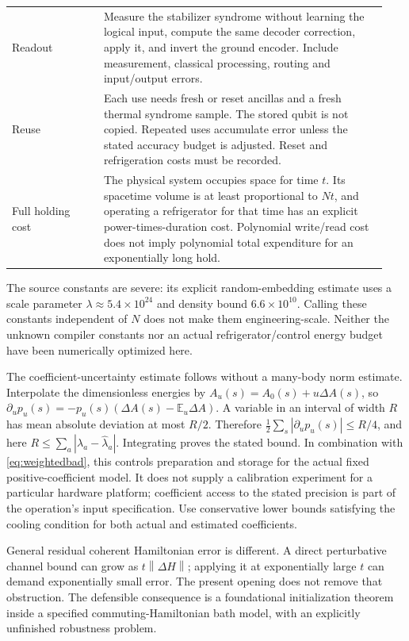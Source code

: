 \documentclass[11pt,a4paper]{article}
\newcommand{\norm}[1]{\left\lVert#1\right\rVert}
\begin{document}
\begin{longtable}{@{}P{0.23\linewidth}P{0.71\linewidth}@{}}
Readout & Measure the stabilizer syndrome without learning the logical input, compute the same decoder correction, apply it, and invert the ground encoder. Include measurement, classical processing, routing and input/output errors.\\[5pt]
Reuse & Each use needs fresh or reset ancillas and a fresh thermal syndrome sample. The stored qubit is not copied. Repeated uses accumulate error unless the stated accuracy budget is adjusted. Reset and refrigeration costs must be recorded.\\[5pt]
Full holding cost & The physical system occupies space for time $t$. Its spacetime volume is at least proportional to $Nt$, and operating a refrigerator for that time has an explicit power-times-duration cost. Polynomial write/read cost does not imply polynomial total expenditure for an exponentially long hold.\\
\bottomrule
\end{longtable}
\endgroup

The source constants are severe: its explicit random-embedding estimate uses a scale parameter $\lambda\approx5.4\times10^{24}$ and density bound $6.6\times10^{10}$.\cite{bdl} Calling these constants independent of $N$ does not make them engineering-scale. Neither the unknown compiler constants nor an actual refrigerator/control energy budget have been numerically optimized here.

The coefficient-uncertainty estimate follows without a many-body norm estimate. Interpolate the dimensionless energies by $A_u(s)=A_0(s)+u\Delta A(s)$, so
$\partial_up_u(s)=-p_u(s)(\Delta A(s)-\mathbb E_u\Delta A)$.
A variable in an interval of width $R$ has mean absolute deviation at most $R/2$. Therefore $\frac12\sum_s|\partial_up_u(s)|\leq R/4$, and here $R\leq\sum_a|\lambda_a-\widehat\lambda_a|$. Integrating proves the stated bound. In combination with \eqref{eq:weightedbad}, this controls preparation and storage for the actual fixed positive-coefficient model. It does not supply a calibration experiment for a particular hardware platform; coefficient access to the stated precision is part of the operation's input specification. Use conservative lower bounds satisfying the cooling condition for both actual and estimated coefficients.

General residual coherent Hamiltonian error is different. A direct perturbative channel bound can grow as $t\norm{\Delta H}$; applying it at exponentially large $t$ can demand exponentially small error. The present opening does not remove that obstruction. The defensible consequence is a foundational initialization theorem inside a specified commuting-Hamiltonian bath model, with an explicitly unfinished robustness problem.
\end{document}
